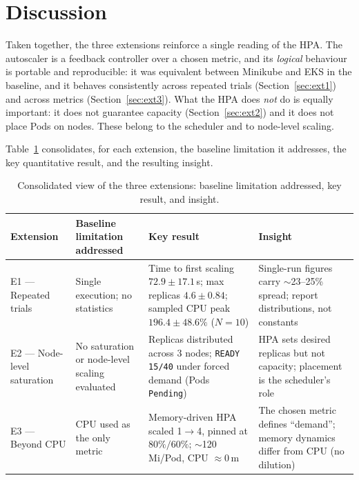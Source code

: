 \documentclass[conference]{IEEEtran}
\begin{document}
\section{Discussion}
\label{sec:disc}
Taken together, the three extensions reinforce a single reading of the HPA. The
autoscaler is a feedback controller over a chosen metric, and its \emph{logical}
behaviour is portable and reproducible: it was equivalent between Minikube and EKS
in the baseline, and it behaves consistently across repeated trials
(Section~\ref{sec:ext1}) and across metrics (Section~\ref{sec:ext3}). What the
HPA does \emph{not} do is equally important: it does not guarantee capacity
(Section~\ref{sec:ext2}) and it does not place Pods on nodes. These belong to the
scheduler and to node-level scaling.

Table~\ref{tab:consolidado} consolidates, for each extension, the baseline
limitation it addresses, the key quantitative result, and the resulting insight.

\begin{table}[!t]
\caption{Consolidated view of the three extensions: baseline limitation
addressed, key result, and insight.}
\label{tab:consolidado}
\centering
\small
\setlength{\tabcolsep}{4pt}
\renewcommand{\arraystretch}{1.2}
\begin{tabular}{@{}p{}p{}p{}p{}@{}}
\toprule
\textbf{Extension} & \textbf{Baseline limitation addressed} & \textbf{Key result} & \textbf{Insight} \\
\midrule
E1 --- Repeated trials &
Single execution; no statistics &
Time to first scaling $72.9\pm17.1$\,s; max replicas $4.6\pm0.84$; sampled CPU peak $196.4\pm48.6\%$ ($N{=}10$) &
Single-run figures carry $\sim$23--25\% spread; report distributions, not constants \\
\addlinespace
E2 --- Node-level saturation &
No saturation or node-level scaling evaluated &
Replicas distributed across 3 nodes; \texttt{READY 15/40} under forced demand (Pods \texttt{Pending}) &
HPA sets desired replicas but not capacity; placement is the scheduler's role \\
\addlinespace
E3 --- Beyond CPU &
CPU used as the only metric &
Memory-driven HPA scaled 1$\to$4, pinned at $80\%/60\%$; $\sim$120\,Mi/Pod, CPU $\approx$0\,m &
The chosen metric defines ``demand''; memory dynamics differ from CPU (no dilution) \\
\bottomrule
\end{tabular}
\end{table}
\end{document}
